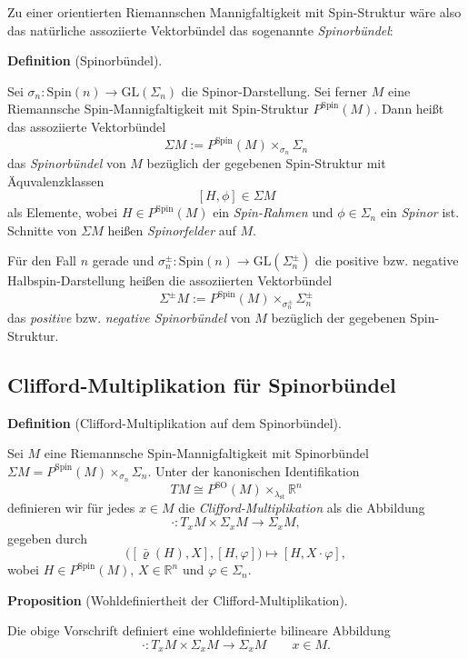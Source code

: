 \documentclass[10pt, letterpaper]{article}
\newcommand{\R}{\mathbb{R}}
\newcommand{\GL}{\mathrm{GL}}
\newcommand{\SO}{\mathrm{SO}}
\newcommand{\Spin}{\mathrm{Spin}}
\newcommand{\CustomHeading}[3]{%
  \par\medskip\noindent%
  \textbf{#1 #2} \textnormal{(#3)}.\enskip%
}
\newenvironment{DEF}[2]{\CustomHeading{Definition}{#1}{#2}}{}
\newenvironment{PROP}[2]{\CustomHeading{Proposition}{#1}{#2}}{}
\begin{document}
\bigskip



Zu einer orientierten Riemannschen Mannigfaltigkeit mit Spin-Struktur wäre also das natürliche assoziierte Vektorbündel das sogenannte \emph{Spinorbündel}:

\begin{DEF}{}{Spinorbündel}
Sei $\sigma_n:\Spin(n)\to \GL(\Sigma_n)$ die Spinor-Darstellung. Sei ferner \(M\) eine Riemannsche Spin-Mannigfaltigkeit mit Spin-Struktur \(P^{\Spin}(M)\). Dann heißt das assoziierte Vektorbündel
\[
\Sigma M:=P^{\Spin}(M)\times_{\sigma_n}\Sigma_n
\]
das \emph{Spinorbündel} von \(M\) bezüglich der gegebenen Spin-Struktur mit Äquvalenzklassen 
$$[H,\phi]\in\Sigma M$$
als Elemente, wobei $H\in P^{\Spin}(M)$ ein \emph{Spin-Rahmen} und $\phi\in \Sigma_n$ ein \emph{Spinor} ist. Schnitte von \(\Sigma M\) heißen \emph{Spinorfelder} auf \(M\).

Für den Fall \(n\) gerade und $\sigma_n^\pm:\Spin(n)\to \GL(\Sigma_n^\pm)$
die positive bzw. negative Halbspin-Darstellung heißen die assoziierten
Vektorbündel
\[
\Sigma^\pm M:=P^{\Spin}(M)\times_{\sigma_n^\pm}\Sigma_n^\pm
\]
das \emph{positive} bzw. \emph{negative Spinorbündel} von \(M\) bezüglich der
gegebenen Spin-Struktur.
\end{DEF}



\subsection{Clifford-Multiplikation für Spinorbündel}

\begin{DEF}{}{Clifford-Multiplikation auf dem Spinorbündel}
Sei \(M\) eine Riemannsche Spin-Mannigfaltigkeit mit Spinorbündel $\Sigma M=P^{\Spin}(M)\times_{\sigma_n}\Sigma_n$. Unter der kanonischen Identifikation
\[
TM \cong P^{\SO}(M)\times_{\lambda_{\mathrm{st}}}\R^n
\]
definieren wir für jedes \(x\in M\) die \emph{Clifford-Multiplikation} als die
Abbildung
\[
\cdot:T_xM\times \Sigma_xM\to \Sigma_xM,
\]
gegeben durch
\[
\bigl([\bar\varrho(H),X],[H,\varphi]\bigr)\longmapsto [H,X\cdot \varphi],
\]
wobei \(H\in P^{\Spin}(M)\), \(X\in \R^n\) und \(\varphi\in \Sigma_n\).
\end{DEF}

\begin{PROP}{}{Wohldefiniertheit der Clifford-Multiplikation}
Die obige Vorschrift definiert eine wohldefinierte bilineare Abbildung
\[
\cdot:T_xM\times \Sigma_xM\to \Sigma_xM
\qquad x\in M.
\]
\end{PROP}
\end{document}
